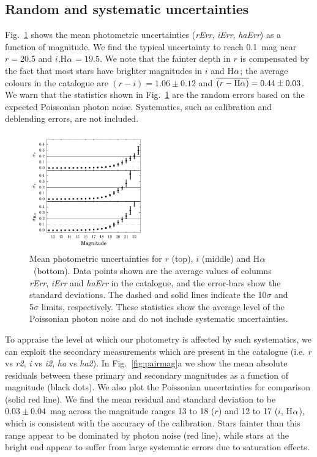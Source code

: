 \documentclass[a4paper,useAMS,usenatbib]{mn2e}
\def\ha{\mbox{H$\rm \alpha$}}
\begin{document}
\subsection{Random and systematic uncertainties}
\label{sec:uncertainties}

Fig.~\ref{fig:uncertainties} shows the mean photometric
uncertainties (\emph{rErr}, \emph{iErr}, \emph{haErr})
as a function of magnitude.
We find the typical uncertainty to reach 0.1~mag near $r=$20.5 
and $i$,\ha$=19.5$.
We note that the fainter depth in $r$ is compensated
by the fact that most stars have brighter magnitudes in $i$ and \ha;
the average colours in the catalogue are
$\overline{(r-i)}=1.06\pm0.12$ and $\overline{(r-\ha)}=0.44\pm0.03$.
We warn that the statistics shown in Fig.~\ref{fig:uncertainties}
are the random errors based on the expected Poissonian photon noise.
Systematics, such as calibration and deblending errors,
are not included.

\begin{figure}
    \includegraphics[width=0.45\textwidth]{figures/uncertainties/uncertainties.pdf} 
    \caption{Mean photometric uncertainties
             for $r$ (top), $i$ (middle) and \ha\ (bottom).
             Data points shown are the average values of
             columns \emph{rErr}, \emph{iErr} and \emph{haErr}
             in the catalogue,
             and the error-bars show the standard deviations.
             The dashed and solid lines indicate 
             the 10$\sigma$ and 5$\sigma$ limits, respectively.
             These statistics show the average level of the Poissonian
             photon noise and do not include systematic uncertainties.}
    \label{fig:uncertainties}
\end{figure}

To appraise the level at which our photometry is affected by such systematics,
we can exploit the secondary measurements which are present in the catalogue
(i.e. \emph{r} vs \emph{r2}, \emph{i} vs \emph{i2}, \emph{ha} vs \emph{ha2}).
In Fig.~\ref{fig:pairmag}a we show the mean absolute residuals between
these primary and secondary magnitudes as a function of magnitude (black dots).
We also plot the Poissonian uncertainties for comparison (solid red line).
We find the mean residual and standard deviation to be $0.03\pm0.04$~mag
across the magnitude ranges 13 to 18 ($r$)
and 12 to 17 ($i$, \ha),
which is consistent with the accuracy of the calibration.
Stars fainter than this range appear to be dominated by photon noise (red line),
while stars at the bright end appear to suffer from large systematic
errors due to saturation effects.
\end{document}
